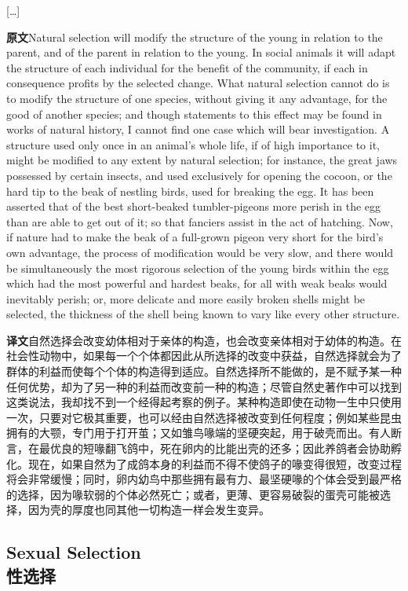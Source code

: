 \documentclass[UTF8,zihao=-4]{ctexart}
\newcommand{\BodyFont}{\fontsize{10.5pt}{15.5pt}\selectfont}
\newcommand{\origlabel}{\textbf{原文}\quad}
\newcommand{\translabel}{\textbf{译文}\quad}
\newenvironment{enblock}{\par\noindent\begingroup\BodyFont\origlabel}{\par\endgroup}
\newenvironment{zhblock}{\par\noindent\begingroup\BodyFont\translabel}{\par\endgroup\vspace{0.35em}}
\newcommand{\pair}[2]{\begin{enblock}#1\end{enblock}\begin{zhblock}#2\end{zhblock}}
\begin{document}
\begin{center}
[\ldots]
\end{center}

\pair{Natural selection will modify the structure of the young in relation to the parent, and of the parent in relation to the young. In social animals it will adapt the structure of each individual for the benefit of the community, if each in consequence profits by the selected change. What natural selection cannot do is to modify the structure of one species, without giving it any advantage, for the good of another species; and though statements to this effect may be found in works of natural history, I cannot find one case which will bear investigation. A structure used only once in an animal's whole life, if of high importance to it, might be modified to any extent by natural selection; for instance, the great jaws possessed by certain insects, and used exclusively for opening the cocoon, or the hard tip to the beak of nestling birds, used for breaking the egg. It has been asserted that of the best short-beaked tumbler-pigeons more perish in the egg than are able to get out of it; so that fanciers assist in the act of hatching. Now, if nature had to make the beak of a full-grown pigeon very short for the bird's own advantage, the process of modification would be very slow, and there would be simultaneously the most rigorous selection of the young birds within the egg which had the most powerful and hardest beaks, for all with weak beaks would inevitably perish; or, more delicate and more easily broken shells might be selected, the thickness of the shell being known to vary like every other structure.}{自然选择会改变幼体相对于亲体的构造，也会改变亲体相对于幼体的构造。在社会性动物中，如果每一个个体都因此从所选择的改变中获益，自然选择就会为了群体的利益而使每个个体的构造得到适应。自然选择所不能做的，是不赋予某一种任何优势，却为了另一种的利益而改变前一种的构造；尽管自然史著作中可以找到这类说法，我却找不到一个经得起考察的例子。某种构造即使在动物一生中只使用一次，只要对它极其重要，也可以经由自然选择被改变到任何程度；例如某些昆虫拥有的大颚，专门用于打开茧；又如雏鸟喙端的坚硬突起，用于破壳而出。有人断言，在最优良的短喙翻飞鸽中，死在卵内的比能出壳的还多；因此养鸽者会协助孵化。现在，如果自然为了成鸽本身的利益而不得不使鸽子的喙变得很短，改变过程将会非常缓慢；同时，卵内幼鸟中那些拥有最有力、最坚硬喙的个体会受到最严格的选择，因为喙软弱的个体必然死亡；或者，更薄、更容易破裂的蛋壳可能被选择，因为壳的厚度也同其他一切构造一样会发生变异。}

\subsection*{Sexual Selection\\性选择}
\end{document}
